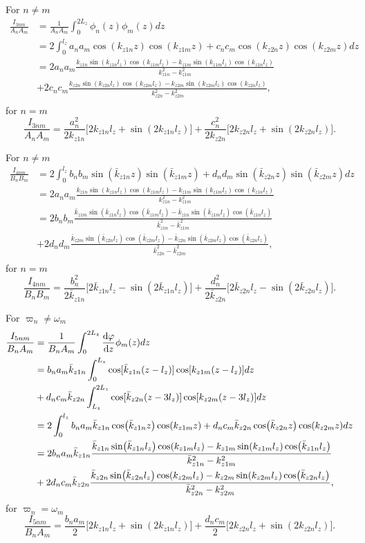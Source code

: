 \documentclass{article}
\begin{document}
For $n\ne m$
\[\begin{aligned}
\frac{I_{3nm}}{A_nA_m}&=\frac{1}{A_nA_m}\int_0^{2L_z}\phi_n(z)\phi_m(z)dz \\
&=2\int_{0}^{l_z}a_na_m \cos(k_{z1n}z)\cos(k_{z1m}z) + c_nc_m\cos(k_{z2n}z)\cos(k_{z2m}z) dz \\
&= 2a_na_m\frac{k_{z1n}\sin(k_{z1n}l_z)\cos(k_{z1m}l_z)-k_{z1m}\sin(k_{z1m}l_z)\cos(k_{z1n}l_z)}{k_{z1n}^2-k_{z1m}^2} \\
&+2c_nc_m\frac{k_{z2n}\sin(k_{z2n}l_z)\cos(k_{z2m}l_z)-k_{z2m}\sin(k_{z2m}l_z)\cos(k_{z2n}l_z)}{k_{z2n}^2-k_{z2m}^2}, \\
\end{aligned}\]
for $n=m$
\[\frac{I_{3nm}}{A_nA_m} = \frac{a_n^2}{2k_{z1n}}\Big[2k_{z1n}l_z+\sin(2k_{z1n}l_z)\Big]+\frac{c_n^2}{2k_{z2n}}\Big[2k_{z2n}l_z+\sin(2k_{z2n}l_z)\Big].\]

For $n\ne m$
\[\begin{aligned}
\frac{I_{4nm}}{B_nB_m}&=2\int_{0}^{l_z}b_nb_m \sin(\bar{k}_{z1n}z)\sin(\bar{k}_{z1m}z) + d_nd_m\sin(\bar{k}_{z2n}z)\sin(\bar{k}_{z2m}z) dz \\
&= 2a_na_m\frac{k_{z1n}\sin(k_{z1n}l_z)\cos(k_{z1m}l_z)-k_{z1m}\sin(k_{z1m}l_z)\cos(k_{z1n}l_z)}{k_{z1n}^2-k_{z1m}^2} \\
&= 2b_nb_m\frac{\bar{k}_{z1m}\sin(\bar{k}_{z1n}l_z)\cos(\bar{k}_{z1m}l_z)-\bar{k}_{z1n}\sin(\bar{k}_{z1m}l_z)\cos(\bar{k}_{z1n}l_z)}{\bar{k}_{z1n}^2-\bar{k}_{z1m}^2} \\
&+2d_nd_m\frac{\bar{k}_{z2m}\sin(\bar{k}_{z2n}l_z)\cos(\bar{k}_{z2m}l_z)-\bar{k}_{z2n}\sin(\bar{k}_{z2m}l_z)\cos(\bar{k}_{z2n}l_z)}{\bar{k}_{z2n}^2-\bar{k}_{z2m}^2}, \\
\end{aligned}\]
for $n=m$
\[\frac{I_{4nm}}{B_nB_m} = \frac{b_n^2}{2\bar{k}_{z1n}}\Big[2\bar{k}_{z1n}l_z-\sin(2\bar{k}_{z1n}l_z)\Big]+\frac{d_n^2}{2\bar{k}_{z2n}}\Big[2\bar{k}_{z2n}l_z-\sin(2\bar{k}_{z2n}l_z)\Big].\]

For $\varpi_n\ne \omega_m$
\[\begin{aligned}
\frac{I_{5nm}}{B_nA_m}&=\frac{1}{B_nA_m}\int_0^{2L_z}\dv{\varphi}{z}\phi_m(z)dz\\ 
&= b_na_m\bar{k}_{z1n}\int_0^{L_z}\cos[\bar{k}_{z1n}(z-l_z)]\cos[k_{z1m}(z-l_z)] dz \\
&+ d_nc_m\bar{k}_{z2n}\int_{L_z}^{2L_z}\cos[\bar{k}_{z2n}(z-3l_z)]\cos[k_{z2m}(z-3l_z)] dz \\
&=2\int_{0}^{l_z}b_na_m\bar{k}_{z1n}\cos(\bar{k}_{z1n}z)\cos(k_{z1m}z) + d_nc_m\bar{k}_{z2n}\cos(\bar{k}_{z2n}z)\cos(k_{z2m}z)dz \\
&= 2b_na_m\bar{k}_{z1n}\frac{\bar{k}_{z1n}\sin(\bar{k}_{z1n}l_z)\cos(k_{z1m}l_z)-k_{z1m}\sin(k_{z1m}l_z)\cos(\bar{k}_{z1n}l_z)}{\bar{k}_{z1n}^2-k_{z1m}^2} \\
&+2d_nc_m\bar{k}_{z2n}\frac{\bar{k}_{z2n}\sin(\bar{k}_{z2n}l_z)\cos(k_{z2m}l_z)-k_{z2m}\sin(k_{z2m}l_z)\cos(\bar{k}_{z2n}l_z)}{\bar{k}_{z2n}^2-k_{z2m}^2}, \\
\end{aligned}\]
for $\varpi_n= \omega_m$
\[\frac{I_{5nm}}{B_nA_m} = \frac{b_na_m}{2}\Big[2k_{z1n}l_z+\sin(2k_{z1n}l_z)\Big]+\frac{d_nc_m}{2}\Big[2k_{z2n}l_z+\sin(2k_{z2n}l_z)\Big].\]
\end{document}

